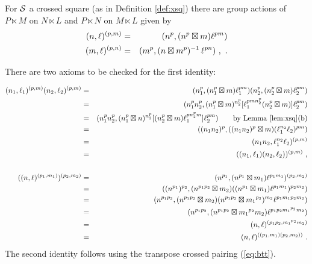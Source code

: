 \begin{prop} \label{prop:semidirect-actions}
For $\mathcal{S}$ a crossed square (as in Definition \ref{def:xsq}) 
there are group actions of $P \ltimes M$  on $N \ltimes L$
and  $P \ltimes N$  on $M \ltimes L$ given by
\begin{eqnarray}
(n,\ell)^{(p,m)} & = &  (n^p, (n^p \boxtimes m)\ell^{pm}) \label{eq:action1}\\ 
(m,\ell)^{(p,n)} & = &  (m^p, (n \boxtimes m^p)^{-1}\,\ell^{pn})~, \label{eq:action2} 
\label{eq:semidirect-action}~.
\end{eqnarray}
\end{prop}
\begin{pf}
There are two axioms to be checked for the first identity: 

\medskip
\begin{eqnarray*}
(n_1,\ell_1)^{(p,m)} (n_2,\ell_2)^{(p,m)}  
& = &  (n_1^p, (n_1^p \boxtimes m)\ell_1^{pm})(n_2^p, (n_2^p \boxtimes m)\ell_2^{pm}) \\
& = &  (n_1^pn_2^p, (n_1^p \boxtimes m)^{n_2^p} 
          [\ell_1^{pmn_2^p}(n_2^p \boxtimes m)] \ell_2^{pm}) \\
& = &  (n_1^pn_2^p, (n_1^p \boxtimes n)^{n_2^p} 
          [(n_2^p \boxtimes m) \ell_1^{pn_2^pm}] \ell_2^{pm}) 
       \qquad\mbox{by Lemma \ref{lem:xsq}(b)} \\
& = &  ((n_1n_2)^p, ((n_1n_2)^p \boxtimes m)(\ell_1^{n_2}\ell_2)^{pm}) \\
& = &  (n_1n_2, \ell_1^{n_2}\ell_2)^{(p,m)} \\
& = &  ((n_1,\ell_1)(n_2,\ell_2))^{(p,m)}~,  \\
&   &  \mbox{} \\
((n,\ell)^{(p_1,m_1)})^{(p_2,m_2)}
& = &  (n^{p_1}, (n^{p_1} \boxtimes m_1)\ell^{p_1m_1})^{(p_2,m_2)} \\
& = &  ((n^{p_1})^{p_2}, (n^{p_1p_2} \boxtimes m_2)
        ((n^{p_1} \boxtimes m_1)\ell^{p_1m_1})^{p_2m_2}) \\
& = &  (n^{p_1p_2}, (n^{p_1p_2} \boxtimes m_2)
        (n^{p_1p_2} \boxtimes {m_1}^{p_2})^{m_2} \ell^{p_1m_1p_2m_2}) \\
& = &  (n^{p_1p_2}, (n^{p_1p_2} \boxtimes {m_1}^{p_2}m_2) 
          \ell^{p_1p_2{m_1}^{p_2}m_2}) \\
& = &  (n,\ell)^{(p_1p_2,{m_1}^{p_2}m_2)} \\
& = &  (n,\ell)^{((p_1,m_1)(p_2,m_2))} ~.
\end{eqnarray*}
The second identity follows using the transpose crossed pairing (\ref{eq:btt}). 
\end{pf}

